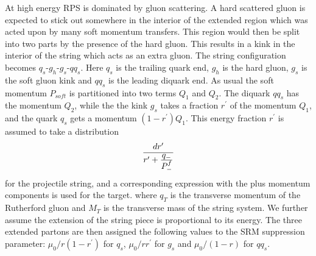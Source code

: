 At high energy RPS is dominated by gluon scattering.  A hard scattered gluon
is expected to stick out somewhere in the interior of the extended region 
which was acted upon by many soft momentum transfers.  
This region would then be split into two parts by the presence of the hard gluon.
This results in a kink in the interior of the string which
acts as an extra gluon.   
The string configuration becomes $q_s$-$g_h$-$g_s$-$qq_s$.  Here $q_s$ 
is the trailing quark end,
$g_h$ is the hard gluon,
$g_s$ is the soft gluon kink 
and $qq_s$ is the leading diquark end.  
As usual the soft momentum $P_{soft}$ is partitioned into two terms
$Q_1$ and $Q_2$. The diquark $qq_s$ has the momentum $Q_2$, while the
the kink $g_s$ takes a fraction $r^\prime$ of the momentum $Q_1$, and
the quark $q_s$ gets a momentum $(1-r^\prime) Q_1$.
This energy fraction $r^\prime$ is assumed to take a distribution
\begin{equation}
\label{rkink}
{d r^\prime\over {r^\prime+{\textstyle q_-\over \textstyle P^f_-}} }  
\end{equation}
for the projectile string, and a corresponding expression with the plus
momentum components is used for the target.  
where $q_T$ is the transverse momentum of the Rutherford gluon and 
$M_T$ is the transverse mass of the string system.  
We further assume the extension of the string piece is proportional to
its energy.  The three extended partons are then assigned the following
values to the SRM suppression parameter:
$\mu_0/r(1-r^\prime)$ for $q_s$, $\mu_0/rr^\prime$ for $g_s$ and 
$\mu_0/(1-r)$ for $qq_s$.  

